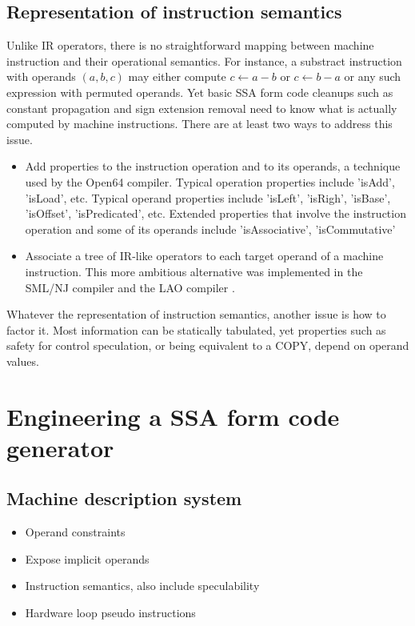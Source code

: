 \subsection{Representation of instruction semantics}

Unlike IR operators, there is no straightforward mapping between machine
instruction and their operational semantics. For instance, a substract
instruction with operands $(a,b,c)$ may either compute $c \leftarrow a-b$ or $c
\leftarrow b-a$ or any such expression with permuted operands. Yet basic SSA
form code cleanups such as constant propagation and sign extension removal need
to know what is actually computed by machine instructions. There are at least
two ways to address this issue. \begin{itemize}
\item Add properties to the instruction operation and to its operands, a
technique used by the Open64 compiler. Typical operation properties include
'isAdd', 'isLoad', etc. Typical operand properties include 'isLeft', 'isRigh',
'isBase', 'isOffset', 'isPredicated', etc. Extended properties that involve the
instruction operation and some of its operands include 'isAssociative',
'isCommutative'
\item Associate a tree of IR-like operators to each target operand of a machine
instruction. This more ambitious alternative was implemented in the SML/NJ
\cite{Leung:1999:PLDI} compiler and the LAO compiler \cite{Dinechin:2000:CASES}.
\end{itemize}
Whatever the representation of instruction semantics, another issue is how to
factor it. Most information can be statically tabulated, yet properties such as
safety for control speculation, or being equivalent to a COPY, depend on operand
values.


\section{Engineering a SSA form code generator}
\label{sec:ssa-codegen-engineering}

\subsection{Machine description system}

\begin{itemize}

\item Operand constraints

\item Expose implicit operands

\item Instruction semantics, also include speculability

\item Hardware loop pseudo instructions

\end{itemize}

